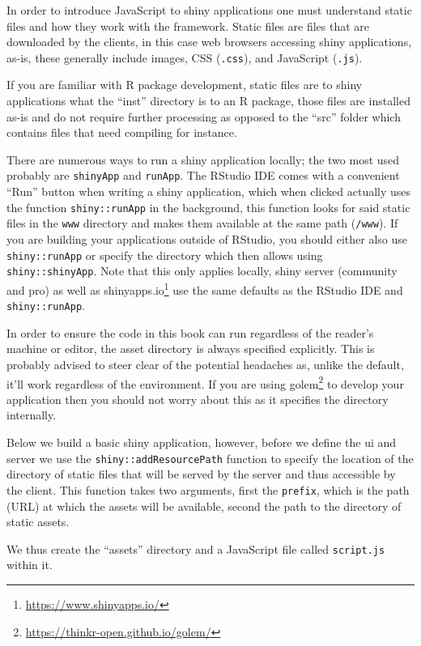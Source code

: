\documentclass[
]{krantz}
\renewcommand{\href}[2]{#2\footnote{\url{#1}}}
\begin{document}
In order to introduce JavaScript to shiny applications one must understand static files and how they work with the framework. Static files are files that are downloaded by the clients, in this case web browsers accessing shiny applications, as-is, these generally include images, CSS (\texttt{.css}), and JavaScript (\texttt{.js}).

If you are familiar with R package development, static files are to shiny applications what the ``inst'' directory is to an R package, those files are installed as-is and do not require further processing as opposed to the ``src'' folder which contains files that need compiling for instance.

There are numerous ways to run a shiny application locally; the two most used probably are \texttt{shinyApp} and \texttt{runApp}. The RStudio IDE comes with a convenient ``Run'' button when writing a shiny application, which when clicked actually uses the function \texttt{shiny::runApp} in the background, this function looks for said static files in the \texttt{www} directory and makes them available at the same path (\texttt{/www}). If you are building your applications outside of RStudio, you should either also use \texttt{shiny::runApp} or specify the directory which then allows using \texttt{shiny::shinyApp}. Note that this only applies locally, shiny server (community and pro) as well as \href{https://www.shinyapps.io/}{shinyapps.io} use the same defaults as the RStudio IDE and \texttt{shiny::runApp}.

In order to ensure the code in this book can run regardless of the reader's machine or editor, the asset directory is always specified explicitly. This is probably advised to steer clear of the potential headaches as, unlike the default, it'll work regardless of the environment. If you are using \href{https://thinkr-open.github.io/golem/}{golem} \citep{R-golem} to develop your application then you should not worry about this as it specifies the directory internally.

Below we build a basic shiny application, however, before we define the ui and server we use the \texttt{shiny::addResourcePath} function to specify the location of the directory of static files that will be served by the server and thus accessible by the client. This function takes two arguments, first the \texttt{prefix}, which is the path (URL) at which the assets will be available, second the path to the directory of static assets.

We thus create the ``assets'' directory and a JavaScript file called \texttt{script.js} within it.
\end{document}
